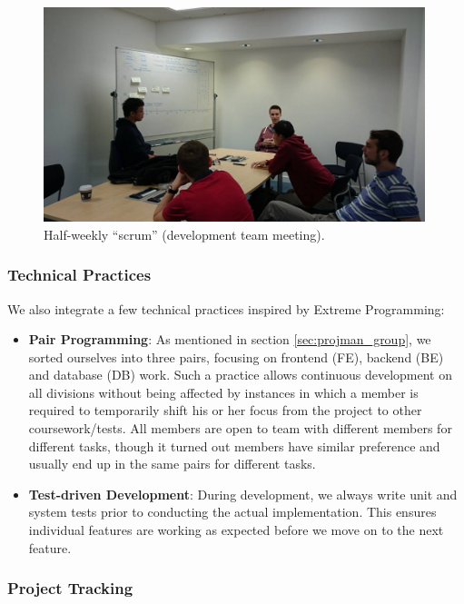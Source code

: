 \documentclass[a4paper, titlepage]{article}
\begin{document}
\begin{figure}[h!]
  \centering
    \includegraphics[width = 0.99\textwidth, trim= 0 0 0 3cm, clip]{./projman/scrum.jpg}
  \caption{Half-weekly ``scrum'' (development team meeting).}
  \label{fig:projman_scrum}
\end{figure}

\subsubsection{Technical Practices}

We also integrate a few technical practices inspired by Extreme Programming:
\begin{itemize}
  \item \textbf{Pair Programming}: As mentioned in section \ref{sec:projman_group}, we sorted
        ourselves into three pairs, focusing on frontend (FE), backend (BE) and database (DB) work.
        Such a practice allows continuous development on all divisions without
        being affected by instances in which a member is required to temporarily shift his or her
        focus from the project to other coursework/tests. All members are open to team
        with different members for different tasks, though it turned out members have similar
        preference and usually end up in the same pairs for different tasks.
  \item \textbf{Test-driven Development}: During development, we always write unit and system tests prior to conducting the actual implementation. This ensures individual features are working as expected before we move on to the next feature.

\end{itemize} 

\subsubsection{Project Tracking} \label{sec:projman_tracking}
\end{document}
